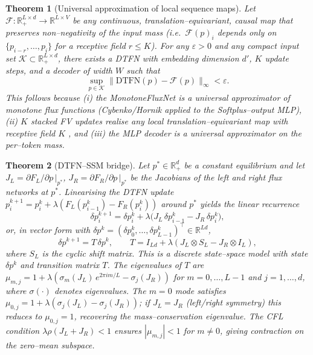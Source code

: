 \documentclass[10pt]{article}
\newtheorem{theorem}{Theorem}
\theoremstyle{definition}
\theoremstyle{remark}
\newcommand{\R}{\mathbb{R}}
\newcommand{\Rplus}{\mathbb{R}_+}
\begin{document}
\begin{theorem}[Universal approximation of local sequence maps]
  \label{thm:univ}
  Let $\mathcal{F}: \Rplus^{L \times d} \to \R^{L \times V}$ be any
  continuous, translation--equivariant, causal map that preserves
  non--negativity of the input mass (i.e.\ $\mathcal{F}(p)_i$ depends
  only on $\{p_{i-r}, \dots, p_i\}$ for a receptive field $r \le K$).
  For any $\varepsilon > 0$ and any compact input set
  $\mathcal{K} \subset \Rplus^{L \times d}$, there exists a DTFN with
  embedding dimension $d'$, $K$ update steps, and a decoder of width
  $W$ such that
  \[
    \sup_{p \in \mathcal{K}} \big\| \mathrm{DTFN}(p) - \mathcal{F}(p)
    \big\|_\infty < \varepsilon.
  \]
  This follows because (i) the MonotoneFluxNet is a universal
  approximator of monotone flux functions (Cybenko/Hornik applied to
  the Softplus--output MLP), (ii) $K$ stacked FV updates realise any
  local translation--equivariant map with receptive field $K$
  \cite{hornik1991approximation}, and (iii) the MLP decoder is a
  universal approximator on the per--token mass.
\end{theorem}

\begin{theorem}[DTFN--SSM bridge]
  \label{thm:ssm}
  Let $p^* \in \R_+^d$ be a constant equilibrium and let
  $J_L = \partial F_L/\partial p\,|_{p^*}$, $J_R = \partial
  F_R/\partial p\,|_{p^*}$ be the Jacobians of the left and right
  flux networks at $p^*$.  Linearising the DTFN update
  $p^{k+1}_i = p^k_i + \lambda(F_L(p^k_{i-1}) - F_R(p^k_i))$ around
  $p^*$ yields the linear recurrence
  \[
    \delta p^{k+1}_i = \delta p^k_i + \lambda\bigl(J_L\, \delta p^k_{i-1}
    - J_R\, \delta p^k_i\bigr),
  \]
  or, in vector form with $\delta p^k = (\delta p^k_0, \dots,
  \delta p^k_{L-1})^\top \in \R^{Ld}$,
  \[
    \delta p^{k+1} = T\, \delta p^k, \qquad
    T = I_{Ld} + \lambda (J_L \otimes S_L - J_R \otimes I_L),
  \]
  where $S_L$ is the cyclic shift matrix.  This is a discrete
  state--space model with state $\delta p^k$ and transition matrix
  $T$.  The eigenvalues of $T$ are
  $\mu_{m,j} = 1 + \lambda(\sigma_m(J_L)\, e^{2\pi i m/L} -
  \sigma_j(J_R))$ for $m = 0, \dots, L-1$ and $j = 1, \dots, d$,
  where $\sigma(\cdot)$ denotes eigenvalues.  The $m = 0$ mode
  satisfies $\mu_{0,j} = 1 + \lambda(\sigma_j(J_L) - \sigma_j(J_R))$;
  if $J_L = J_R$ (left/right symmetry) this reduces to $\mu_{0,j} =
  1$, recovering the mass--conservation eigenvalue.  The CFL
  condition $\lambda \rho(J_L + J_R) < 1$ ensures
  $|\mu_{m,j}| < 1$ for $m \ne 0$, giving contraction on the
  zero--mean subspace.
\end{theorem}
\end{document}
